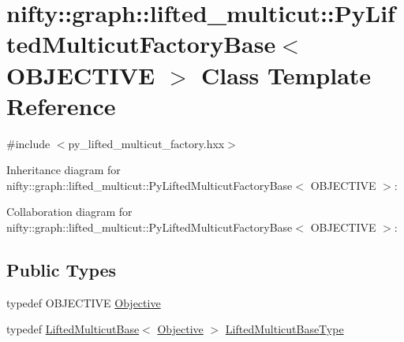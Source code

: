 \hypertarget{classnifty_1_1graph_1_1lifted__multicut_1_1PyLiftedMulticutFactoryBase}{}\section{nifty\+:\+:graph\+:\+:lifted\+\_\+multicut\+:\+:Py\+Lifted\+Multicut\+Factory\+Base$<$ O\+B\+J\+E\+C\+T\+I\+V\+E $>$ Class Template Reference}
\label{classnifty_1_1graph_1_1lifted__multicut_1_1PyLiftedMulticutFactoryBase}


{\ttfamily \#include $<$py\+\_\+lifted\+\_\+multicut\+\_\+factory.\+hxx$>$}



Inheritance diagram for nifty\+:\+:graph\+:\+:lifted\+\_\+multicut\+:\+:Py\+Lifted\+Multicut\+Factory\+Base$<$ O\+B\+J\+E\+C\+T\+I\+V\+E $>$\+:


Collaboration diagram for nifty\+:\+:graph\+:\+:lifted\+\_\+multicut\+:\+:Py\+Lifted\+Multicut\+Factory\+Base$<$ O\+B\+J\+E\+C\+T\+I\+V\+E $>$\+:
\subsection*{Public Types}
\begin{DoxyCompactItemize}
\item 
typedef O\+B\+J\+E\+C\+T\+I\+V\+E \hyperlink{classnifty_1_1graph_1_1lifted__multicut_1_1PyLiftedMulticutFactoryBase_a00bf8d423b596b2842021a7828ed1e33}{Objective}
\item 
typedef \hyperlink{classnifty_1_1graph_1_1lifted__multicut_1_1LiftedMulticutBase}{Lifted\+Multicut\+Base}$<$ \hyperlink{classnifty_1_1graph_1_1lifted__multicut_1_1PyLiftedMulticutFactoryBase_a00bf8d423b596b2842021a7828ed1e33}{Objective} $>$ \hyperlink{classnifty_1_1graph_1_1lifted__multicut_1_1PyLiftedMulticutFactoryBase_a741c8fdfdc6b6ff7d007a27b56dfb300}{Lifted\+Multicut\+Base\+Type}
\end{DoxyCompactItemize}
